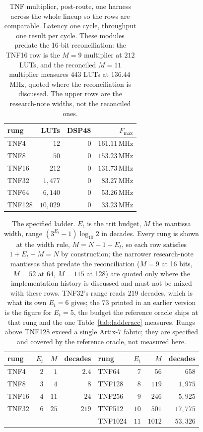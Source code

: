 \documentclass[11pt]{article}
\theoremstyle{definition}
\begin{document}
\begin{table}[t]\centering
\caption{TNF multiplier, post-route, one harness across the whole lineup so the
rows are comparable. Latency one cycle, throughput one result per cycle. These
modules predate the 16-bit reconciliation: the TNF16 row is the $M = 9$ multiplier
at $212$ LUTs, and the reconciled $M = 11$ multiplier measures $443$ LUTs at
$136.44$\,MHz, quoted where the reconciliation is discussed. The upper rows are the
research-note widths, not the reconciled ones.}
\label{tab:ladder}
\begin{tabular}{lrrr}
\toprule
rung & LUTs & DSP48 & $F_{\max}$ \\
\midrule
TNF4  & $12$      & $0$ & $161.11$\,MHz \\
TNF8  & $50$      & $0$ & $153.23$\,MHz \\
TNF16 & $212$     & $0$ & $131.73$\,MHz \\
TNF32  & $1{,}477$  & $0$ & $83.27$\,MHz \\
TNF64  & $6{,}140$  & $0$ & $53.26$\,MHz \\
TNF128 & $10{,}029$ & $0$ & $33.23$\,MHz \\
\bottomrule
\end{tabular}
\end{table}

\begin{table}[t]\centering
\caption{The specified ladder. $E_t$ is the trit budget, $M$ the mantissa width,
range $(3^{E_t}-1)\log_{10}2$ in decades. Every rung is shown at the width
rule, $M = N-1-E_t$, so each row satisfies $1+E_t+M=N$ by construction; the
narrower research-note mantissas that predate the reconciliation ($M=9$ at 16
bits, $M=52$ at 64, $M=115$ at 128) are quoted only where the implementation
history is discussed and must not be mixed with these rows. TNF32's range reads $219$ decades, which is what its own
$E_t = 6$ gives; the $73$ printed in an earlier version is the figure for
$E_t = 5$, the budget the reference oracle ships at that rung and the one
Table~\ref{tab:ladderacc} measures. Rungs above TNF128 exceed a single Artix-7
fabric; they are specified and covered by the reference oracle, not measured
here.}
\label{tab:spec}
\begin{tabular}{lrrr@{\hskip 2em}lrrr}
\toprule
rung & $E_t$ & $M$ & decades & rung & $E_t$ & $M$ & decades \\
\midrule
TNF4  & $2$ & $1$  & $2.4$ & TNF64   & $7$  & $56$   & $658$ \\
TNF8  & $3$ & $4$  & $8$   & TNF128  & $8$  & $119$  & $1{,}975$ \\
TNF16 & $4$ & $11$ & $24$  & TNF256  & $9$  & $246$  & $5{,}925$ \\
TNF32 & $6$ & $25$ & $219$ & TNF512  & $10$ & $501$  & $17{,}775$ \\
       &     &      &       & TNF1024 & $11$ & $1012$ & $53{,}326$ \\
\bottomrule
\end{tabular}
\end{table}
\end{document}
